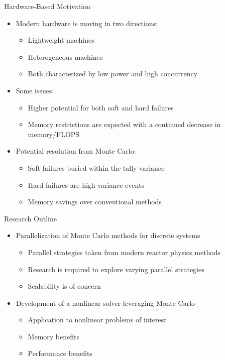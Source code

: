 \documentclass{beamer}
\begin{document}
\begin{frame}{Hardware-Based Motivation}

  \begin{itemize}
  \item Modern hardware is moving in two directions:
    \begin{itemize}
    \item Lightweight machines
    \item Heterogeneous machines
    \item Both characterized by low power and high concurrency
    \end{itemize}
  \item Some issues:
    \begin{itemize}
    \item Higher potential for both soft and hard failures
    \item Memory restrictions are expected with a continued decrease
      in memory/FLOPS
    \end{itemize}
  \item Potential resolution from Monte Carlo:
    \begin{itemize}
    \item Soft failures buried within the tally variance
    \item Hard failures are high variance events
    \item Memory savings over conventional methods
    \end{itemize}
  \end{itemize}

\end{frame}

\begin{frame}{Research Outline}
  \begin{itemize}
    \item Parallelization of Monte Carlo methods for discrete systems
      \begin{itemize}
      \item Parallel strategies taken from modern reactor physics
        methods
      \item Research is required to explore varying parallel
        strategies
      \item Scalability is of concern
      \end{itemize}
    \item Development of a nonlinear solver leveraging Monte Carlo
      \begin{itemize}
        \item Application to nonlinear problems of interest
        \item Memory benefits
        \item Performance benefits
      \end{itemize}
  \end{itemize}
\end{frame}
\end{document}
